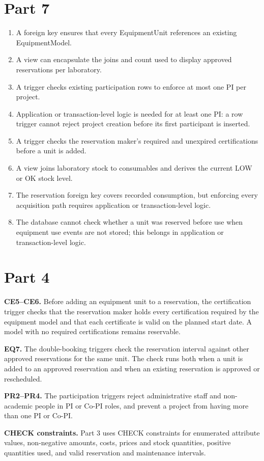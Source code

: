 \documentclass[a4paper,12pt]{article}
\begin{document}
\section*{Part 7}
\begin{enumerate}
  \item A foreign key ensures that every EquipmentUnit references an existing EquipmentModel.
  \item A view can encapsulate the joins and count used to display approved reservations per laboratory.
  \item A trigger checks existing participation rows to enforce at most one PI per project.
  \item Application or transaction-level logic is needed for at least one PI: a row trigger cannot reject project creation before its first participant is inserted.
  \item A trigger checks the reservation maker's required and unexpired certifications before a unit is added.
  \item A view joins laboratory stock to consumables and derives the current LOW or OK stock level.
  \item The reservation foreign key covers recorded consumption, but enforcing every acquisition path requires application or transaction-level logic.
  \item The database cannot check whether a unit was reserved before use when equipment use events are not stored; this belongs in application or transaction-level logic.
\end{enumerate}

\section*{Part 4}
\noindent\textbf{CE5--CE6.} Before adding an equipment unit to a reservation, the certification trigger checks that the reservation maker holds every certification required by the equipment model and that each certificate is valid on the planned start date. A model with no required certifications remains reservable.

\medskip
\noindent\textbf{EQ7.} The double-booking triggers check the reservation interval against other approved reservations for the same unit. The check runs both when a unit is added to an approved reservation and when an existing reservation is approved or rescheduled.

\medskip
\noindent\textbf{PR2--PR4.} The participation triggers reject administrative staff and non-academic people in PI or Co-PI roles, and prevent a project from having more than one PI or Co-PI.

\medskip
\noindent\textbf{CHECK constraints.} Part 3 uses CHECK constraints for enumerated attribute values, non-negative amounts, costs, prices and stock quantities, positive quantities used, and valid reservation and maintenance intervals.
\end{document}

